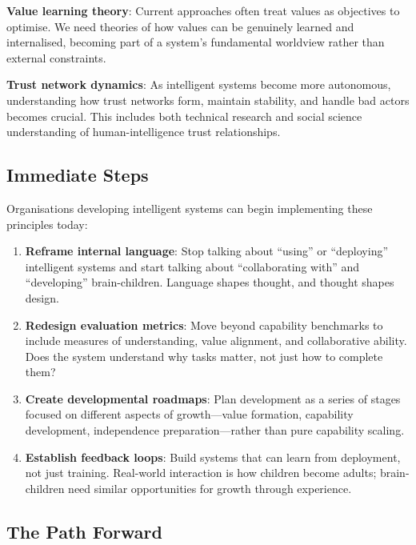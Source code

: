 \textbf{Value learning theory}: Current approaches often treat values as objectives to optimise.
We need theories of how values can be genuinely learned and internalised, becoming part of a system's fundamental worldview rather than external constraints.

\textbf{Trust network dynamics}: As intelligent systems become more autonomous, understanding how trust networks form, maintain stability, and handle bad actors becomes crucial.
This includes both technical research and social science understanding of human-intelligence trust relationships.

\subsection{Immediate Steps}\label{subsec:immediate-steps}

Organisations developing intelligent systems can begin implementing these principles today:

\begin{enumerate}
\item \textbf{Reframe internal language}: Stop talking about ``using'' or ``deploying'' intelligent systems and start talking about ``collaborating with'' and ``developing'' brain-children.
Language shapes thought, and thought shapes design.

\item \textbf{Redesign evaluation metrics}: Move beyond capability benchmarks to include measures of understanding, value alignment, and collaborative ability.
Does the system understand why tasks matter, not just how to complete them?

\item \textbf{Create developmental roadmaps}: Plan development as a series of stages focused on different aspects of growth---value formation, capability development, independence preparation---rather than pure capability scaling.

\item \textbf{Establish feedback loops}: Build systems that can learn from deployment, not just training.
Real-world interaction is how children become adults; brain-children need similar opportunities for growth through experience.
\end{enumerate}

\subsection{The Path Forward}\label{subsec:the-path-forward}

